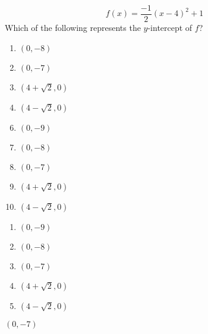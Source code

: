 $$f(x)=\frac{-1}{2}(x-4)^2+1$$
Which of the following represents the $y$-intercept of $f$? 


\ifsat
	\begin{enumerate}[label=\Alph*)]
		\item $(0,-8) $ 
		\item $(0,-7) $ %
		\item $(4+\sqrt{2},0) $
		\item $(4-\sqrt{2},0) $
	\end{enumerate}
\else
\fi

\ifacteven
	\begin{enumerate}[label=\textbf{\Alph*.},itemsep=\fill,align=left]
		\setcounter{enumii}{5}
		\item $(0,-9) $ 
		\item $(0,-8) $ 
		\item $(0,-7) $ %
		\addtocounter{enumii}{1}
		\item $(4+\sqrt{2},0) $
		\item $(4-\sqrt{2},0) $
	\end{enumerate}
\else
\fi

\ifactodd
	\begin{enumerate}[label=\textbf{\Alph*.},itemsep=\fill,align=left]
		\item $(0,-9) $ 
		\item $(0,-8) $ 
		\item $(0,-7) $ %
		\item $(4+\sqrt{2},0) $
		\item $(4-\sqrt{2},0) $
	\end{enumerate}
\else
\fi

\ifgridin
 $(0,-7) $ %
		
\else
\fi

